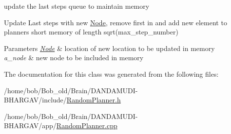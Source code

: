 update the last steps queue to maintain memory 

Update Last steps with new \hyperlink{structNode}{Node}, remove first in and add new element to planners short memory of length sqrt(max\+\_\+step\+\_\+number)


\begin{DoxyParams}{Parameters}
{\em \hyperlink{structNode}{Node}} & location of new location to be updated in memory\\
\hline
{\em a\+\_\+node} & new node to be included in memory \\
\hline
\end{DoxyParams}


The documentation for this class was generated from the following files\+:\begin{DoxyCompactItemize}
\item 
/home/bob/\+Bob\+\_\+old/\+Brain/\+D\+A\+N\+D\+A\+M\+U\+D\+I-\/\+B\+H\+A\+R\+G\+A\+V/include/\hyperlink{RandomPlanner_8h}{Random\+Planner.\+h}\item 
/home/bob/\+Bob\+\_\+old/\+Brain/\+D\+A\+N\+D\+A\+M\+U\+D\+I-\/\+B\+H\+A\+R\+G\+A\+V/app/\hyperlink{RandomPlanner_8cpp}{Random\+Planner.\+cpp}\end{DoxyCompactItemize}
